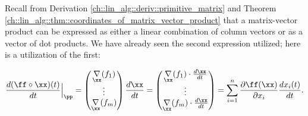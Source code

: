 \begin{lemma}
    Recall from Derivation \ref{ch::lin_alg::deriv::primitive_matrix} and Theorem \ref{ch::lin_alg::thm::coordinates_of_matrix_vector_product} that a matrix-vector product can be expressed as either a linear combination of column vectors or as a vector of dot products. We have already seen the second expression utilized; here is a utilization of the first:
    
    \begin{align*}
        \frac{d (\ff \circ \xx)(t)}{dt}\Big|_\pp
        =
        \begin{pmatrix}
            \underset{\xx}{\nabla} (f_1)
            \\
            \vdots
            \\
            \underset{\xx}{\nabla} (f_m)
        \end{pmatrix}
        \frac{d \xx}{d t}
        =
        \begin{pmatrix}
            \underset{\xx}{\nabla} (f_1) \cdot \frac{d \xx}{d t}
            \\
            \vdots
            \\
            \underset{\xx}{\nabla} (f_m) \cdot \frac{d \xx}{d t}
        \end{pmatrix}
        =
        \sum_{i = 1}^{n} \frac{\pd \ff(\xx)}{\pd x_i} \frac{d x_i(t)}{d t}.
    \end{align*}
\end{lemma}

